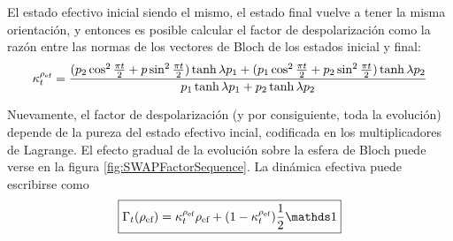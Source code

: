 El estado efectivo inicial siendo el mismo, el estado final vuelve a tener la misma orientación, y entonces es posible calcular el factor de despolarización como la razón entre las normas de los vectores de Bloch de los estados inicial y final:
\begin{equation}\label{eq:SWAPFactort}
  \kappa_{t}^{\rho_{\text{ef}}}=\frac{(p_{2}\cos^{2}{\frac{\pi t}{2}}+p\sin^{2}{\frac{\pi t}{2}})\tanh{\lambda p_{1}}+(p_{1}\cos^{2}{\frac{\pi t}{2}}+p_{2}\sin^{2}{\frac{\pi t}{2}})\tanh{\lambda p_{2}}}{
    p_{1}\tanh{\lambda p_{1}}+p_{2}\tanh{\lambda p_{2}}}
\end{equation}

Nuevamente, el factor de despolarización (y por consiguiente, toda la evolución) depende de la pureza del estado efectivo incial, codificada en los multiplicadores de Lagrange. El efecto gradual de la evolución sobre la esfera de Bloch puede verse en la figura \ref{fig:SWAPFactorSequence}. La dinámica efectiva puede escribirse como
\begin{equation}\label{eq:EffectiveSWAPt}
  \boxed{\Gamma_{t}(\rho_{\ef})=\kappa_{t}^{\rho_{\ef}}\rho_{\ef}+(1-\kappa_{t}^{\rho_{\ef}})\frac{1}{2}\Id}
\end{equation}

